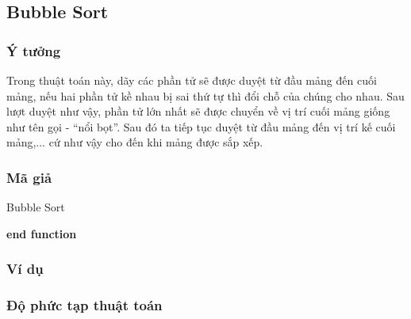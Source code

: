 \subsection{Bubble Sort}

\subsubsection{Ý tưởng}

Trong thuật toán này, dãy các phần tử sẽ được duyệt từ đầu mảng đến 
cuối mảng, nếu hai phần tử kề nhau bị sai thứ tự thì đổi chỗ của chúng 
cho nhau. Sau lượt duyệt như vậy, phần tử lớn nhất sẽ được chuyển về 
vị trí cuối mảng giống như tên gọi - “nổi bọt”. Sau đó ta tiếp tục 
duyệt từ đầu mảng đến vị trí kế cuối mảng,... cứ như vậy cho đến khi 
mảng được sắp xếp.

\subsubsection{Mã giả}

\begin{algorithm}[H]
\caption{Bubble Sort}
\textbf{end function}
\end{algorithm}

\subsubsection{Ví dụ}

\subsubsection{Độ phức tạp thuật toán}

